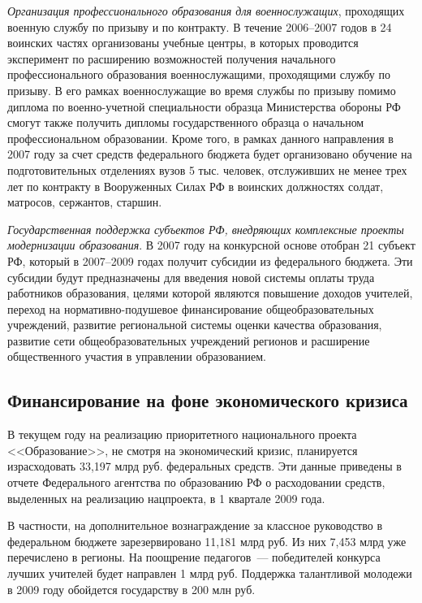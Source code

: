 \documentclass[article, 12pt, russian, oneside]{ncc}
\begin{document}
\emph{Организация профессионального образования для военнослужащих},\linebreak
проходящих военную службу по призыву и по контракту. В течение
2006--2007 годов в 24 воинских частях организованы учебные центры, в
которых проводится эксперимент по расширению возможностей получения
начального профессионального образования военнослужащими, проходящими
службу по призыву. В его рамках военнослужащие во время службы по
призыву помимо диплома по военно-учетной специальности образца
Министерства обороны РФ смогут также получить дипломы государственного
образца о начальном профессиональном образовании. Кроме того, в рамках
данного направления в 2007 году за счет средств федерального бюджета
будет организовано обучение на подготовительных отделениях вузов 5
тыс. человек, отслуживших не менее трех лет по контракту в Вооруженных
Силах РФ в воинских должностях солдат, матросов, сержантов, старшин.

\emph{Государственная поддержка субъектов РФ, внедряющих комплексные
  проекты модернизации образования}. В 2007 году на конкурсной основе
отобран 21 субъект РФ, который в 2007--2009 годах получит субсидии из
федерального бюджета. Эти субсидии будут предназначены для введения
новой системы оплаты труда работников образования, целями которой
являются повышение доходов учителей, переход на нормативно-подушевое
финансирование общеобразовательных учреждений, развитие региональной
системы оценки качества образования, развитие сети общеобразовательных
учреждений регионов и расширение общественного участия в управлении
образованием.

\subsection{Финансирование на фоне экономического кризиса}

В текущем году на реализацию приоритетного национального проекта
<<Образование>>, не смотря на экономический кризис, планируется
израсходовать 33,197 млрд руб. федеральных средств. Эти данные
приведены в отчете Федерального агентства по образованию РФ о
расходовании средств, выделенных на реализацию нацпроекта, в 1
квартале 2009 года.

В частности, на дополнительное вознаграждение за классное руководство
в федеральном бюджете зарезервировано 11,181 млрд руб. Из них 7,453
млрд уже перечислено в регионы. На поощрение педагогов~--- победителей
конкурса лучших учителей будет направлен 1 млрд руб. Поддержка
талантливой молодежи в 2009 году обойдется государству в 200 млн руб.
\end{document}

